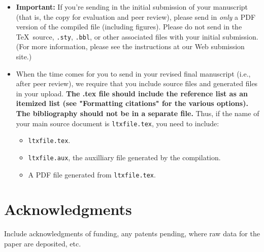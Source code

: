 \documentclass[12pt]{article}
\begin{document}
\begin{itemize}
\item {\bf Important:} If you're sending in the initial submission of
  your manuscript (that is, the copy for evaluation and peer review),
  please send in {\it only\/} a PDF version of the
  compiled file (including figures).  Please do not send in the \TeX\ 
  source, \texttt{.sty}, \texttt{.bbl}, or other associated files with
  your initial submission.  (For more information, please see the
  instructions at our Web submission site.)
\item When the time comes for you to send in your revised final
  manuscript (i.e., after peer review), we require that you include
   source files and generated files in your upload. {\bf The .tex file should include
the reference list as an itemized list (see "Formatting citations"  for the various options). The bibliography should not be in a separate file.}  
  Thus, if the
  name of your main source document is \texttt{ltxfile.tex}, you
  need to include:
\begin{itemize}
\item \texttt{ltxfile.tex}.
\item \texttt{ltxfile.aux}, the auxilliary file generated by the
  compilation.
\item A PDF file generated from
  \texttt{ltxfile.tex}.

\end{itemize}
\end{itemize}











\section*{Acknowledgments}
Include acknowledgments of funding, any patents pending, where raw data for the paper are deposited, etc.

\end{document}
